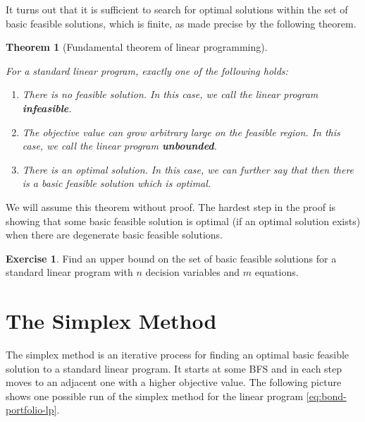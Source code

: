 \documentclass[
]{book}
\providecommand{\tightlist}{%
  \setlength{\itemsep}{0pt}\setlength{\parskip}{0pt}}
\newtheorem{theorem}{Theorem}[chapter]
\theoremstyle{definition}
\theoremstyle{definition}
\theoremstyle{definition}
\newtheorem{exercise}{Exercise}[chapter]
\theoremstyle{definition}
\theoremstyle{remark}
\begin{document}
It turns out that it is sufficient to search for optimal solutions within the set of basic feasible solutions, which is finite, as made precise by the following theorem.

\begin{theorem}[Fundamental theorem of linear programming]
\protect\hypertarget{thm:fundamental-theorem-lp}{}\label{thm:fundamental-theorem-lp}

For a standard linear program, exactly one of the following holds:

\begin{enumerate}
\def\labelenumi{\arabic{enumi}.}
\tightlist
\item
  There is no feasible solution. In this case, we call the linear program \textbf{infeasible}.
\item
  The objective value can grow arbitrary large on the feasible region. In this case, we call the linear program \textbf{unbounded}.
\item
  There is an optimal solution. In this case, we can further say that then there is a basic feasible solution which is optimal.
\end{enumerate}

\end{theorem}

We will assume this theorem without proof.
The hardest step in the proof is showing that some basic feasible solution is optimal (if an optimal solution exists) when there are degenerate basic feasible solutions.

\begin{exercise}
Find an upper bound on the set of basic feasible solutions for a standard linear program with \(n\) decision variables and \(m\) equations.
\end{exercise}

\hypertarget{the-simplex-method}{%
\chapter{The Simplex Method}\label{the-simplex-method}}

The simplex method is an iterative process for finding an optimal basic feasible solution to a standard linear program. It starts at some BFS and in each step moves to an adjacent one with a higher objective value. The following picture shows one possible run of the simplex method for the linear program \eqref{eq:bond-portfolio-lp}.
\end{document}
